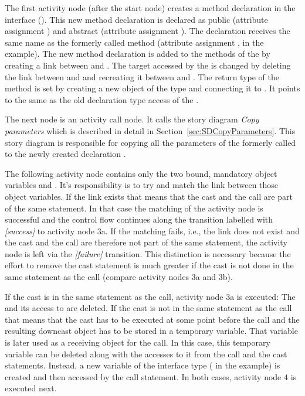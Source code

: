 The first activity node (after the start node) creates a method declaration in the interface (). This new method declaration is declared as public (attribute assignment ) and abstract (attribute assignment ). The declaration receives the same name as the formerly called method (attribute assignment ,  in the example). The new method declaration is added to the methods of the  by creating a  link between  and . The target accessed by the  is changed by deleting the link between  and  and recreating it between  and . The return type of the method is set by creating a new object  of the type  and connecting it to . It points to the same  as the old declaration type access of the .

The next node is an activity call node. It calls the story diagram \emph{Copy parameters} which is described in detail in Section~\ref{sec:SDCopyParameters}. This story diagram is responsible for copying all the parameters of the formerly called  to the newly created declaration .

The following activity node contains only the two bound, mandatory object variables  and . It's responsibility is to try and match the link  between those object variables. If the link exists that means that the cast and the call are part of the same statement. In that case the matching of the activity node is successful and the control flow continues along the transition labelled with \emph{[success]} to activity node 3a. If the matching fails, i.e., the link does not exist and the cast and the call are therefore not part of the same statement, the activity node is left via the \emph{[failure]} transition. This distinction is necessary because the effort to remove the cast statement is much greater if the cast is not done in the same statement as the call (compare activity nodes 3a and 3b).

If the cast is in the same statement as the call, activity node 3a is executed: The  and its access to  are deleted. If the cast is not in the same statement as the call that means that the cast has to be executed at some point before the call and the resulting downcast object has to be stored in a temporary variable. That variable is later used as a receiving object for the call. In this case, this temporary variable can be deleted along with the accesses to it from the call and the cast statements. Instead, a new variable of the interface type ( in the example) is created and then accessed by the call statement. In both cases, activity node 4 is executed next.

